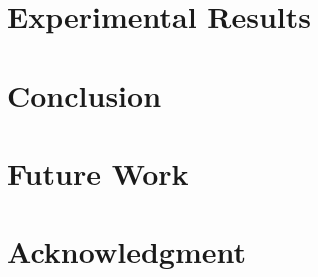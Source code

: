 \documentclass[conference]{IEEEtran}
\begin{document}
\section{Experimental Results} %

\section{Conclusion} %

\section{Future Work} %

\section*{Acknowledgment}

\begin{thebibliography}{1}
\bibitem{}
\end{thebibliography}
\end{document}
